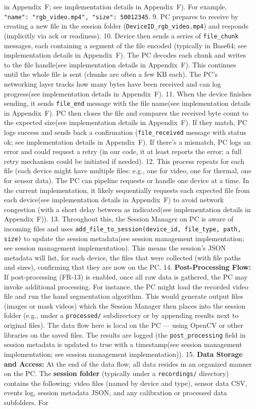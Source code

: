 in Appendix~F; see implementation details in Appendix~F). For example, \texttt{"name": "rgb_video.mp4", "size": 50012345}. 9. PC prepares to receive by creating a new file in the session folder (\texttt{DeviceID_rgb_video.mp4}) and responds (implicitly via ack or readiness). 10. Device then sends a series of \texttt{file\_chunk} messages, each containing a segment of the file encoded (typically in Base64; see implementation details in Appendix~F). The PC decodes each chunk and writes to the file handle(see implementation details in Appendix~F). This continues until the whole file is sent (chunks are often a few KB each). The PC's networking layer tracks how many bytes have been received and can log progress(see implementation details in Appendix~F). 11. When the device finishes sending, it sends \texttt{file\_end} message with the file name(see implementation details in Appendix~F). PC then closes the file and compares the received byte count to the expected size(see implementation details in Appendix~F). If they match, PC logs success and sends back a confirmation (\texttt{file\_received} message with status ok; see implementation details in Appendix~F). If there's a mismatch, PC logs an error and could request a retry (in our code, it at least reports the error; a full retry mechanism could be initiated if needed). 12. This process repeats for each file (each device might have multiple files: e.g., one for video, one for thermal, one for sensor data). The PC can pipeline requests or handle one device at a time. In the current implementation, it likely sequentially requests each expected file from each device(see implementation details in Appendix~F) to avoid network congestion (with a short delay between as indicated(see implementation details in Appendix~F)). 13. Throughout this, the Session Manager on PC is aware of incoming files and uses \texttt{add_file_to_session(device_id, file_type, path, size)} to update the session metadata(see session management implementation; see session management implementation). This means the session's JSON metadata will list, for each device, the files that were collected (with file paths and sizes), confirming that they are now on the PC. 14. \textbf{Post-Processing Flow:} If post-processing (FR-13) is enabled, once all raw data is gathered, the PC may invoke additional processing. For instance, the PC might load the recorded video file and run the hand segmentation algorithm. This would generate output files (images or mask videos) which the Session Manager then places into the session folder (e.g., under a \texttt{processed/} subdirectory or by appending results next to original files). The data flow here is local on the PC --- using OpenCV or other libraries on the saved files. The results are logged (the \texttt{post\_processing} field in session metadata is updated to true with a timestamp(see session management implementation; see session management implementation)). 15. \textbf{Data Storage and Access:} At the end of the data flow, all data resides in an organized manner on the PC. The \textbf{session folder} (typically under a \texttt{recordings/} directory) contains the following: video files (named by device and type), sensor data CSV, events log, session metadata JSON, and any calibration or processed data subfolders. For 